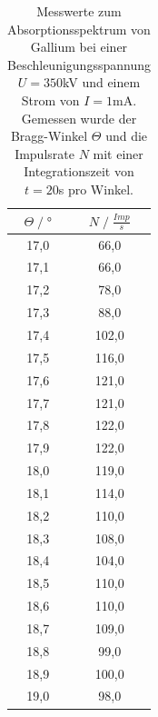 \begin{table}[H]
    \centering
    \begin{tabular}{c c}
        \toprule
        $\Theta\;/\;°$& $N\;/\;\frac{Imp}{s}$\\
        \midrule
        17,0&    66,0\\
        17,1&    66,0\\
        17,2&    78,0\\
        17,3&    88,0\\
        17,4&    102,0\\
        17,5&    116,0\\
        17,6&    121,0\\
        17,7&    121,0\\
        17,8&    122,0\\
        17,9&    122,0\\
        18,0&    119,0\\
        18,1&    114,0\\
        18,2&    110,0\\
        18,3&    108,0\\
        18,4&    104,0\\
        18,5&    110,0\\
        18,6&    110,0\\
        18,7&    109,0\\
        18,8&    99,0\\
        18,9&    100,0\\
        19,0&    98,0\\
        \bottomrule
    \end{tabular}
    \caption{Messwerte zum Absorptionsspektrum von Gallium bei einer Beschleunigungsspannung 
    $U=350$kV und einem Strom von $I=1$mA.\\
    Gemessen wurde der Bragg-Winkel $\Theta$ und die Impulsrate $N$ mit einer Integrationszeit
    von $t=20$s pro Winkel.}
\end{table}
